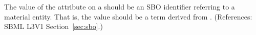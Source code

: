 The value of the  attribute on a \Species should be an SBO
identifier referring to a material entity.  That is, the value
should be a term derived from \sbomaterialentity.  (References: 
SBML L3V1 Section~\ref{sec:sbo}.)
